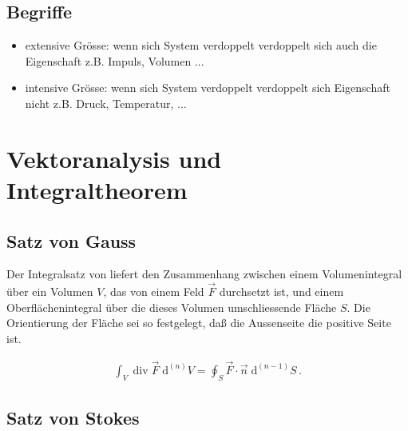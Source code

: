 \documentclass[a4paper]{scrartcl}
\begin{document}
\subsection{Begriffe}
\begin{itemize}
\item extensive Grösse: wenn sich System verdoppelt verdoppelt sich auch die Eigenschaft z.B. Impuls, Volumen ...
\item intensive Grösse: wenn sich System verdoppelt verdoppelt sich Eigenschaft nicht z.B. Druck, Temperatur, ...
\end{itemize}



\section{Vektoranalysis und Integraltheorem}
\subsection{Satz von Gauss}
Der Integralsatz von  liefert den Zusammenhang zwischen einem 
Volumenintegral über ein Volumen $V$, das von einem Feld $\vec F$ durchsetzt
ist, und einem Oberflächenintegral über die dieses Volumen umschliessende
Fläche $S$. Die Orientierung der Fläche sei so festgelegt, daß die Aussenseite
die positive Seite ist.

\begin{align}
\int_V \operatorname{div} \vec F \; \mathrm d^{(n)}V = \oint_{S} \vec F \cdot
\vec n\; \mathrm d^{(n-1)}S\,.
\end{align}
\subsection{Satz von Stokes}
\end{document}
